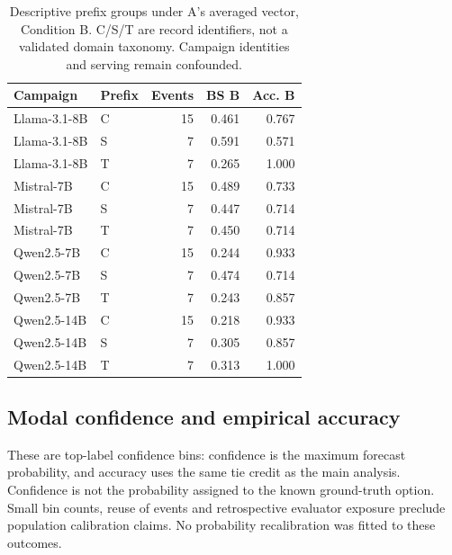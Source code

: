 \begin{table}[!htbp]
\centering\small
\caption{Descriptive prefix groups under A's averaged vector, Condition B. C/S/T are record identifiers, not a validated domain taxonomy. Campaign identities and serving remain confounded.}
\label{tab:full_prefix}
\begin{tabular}{llrrr}
\toprule
Campaign & Prefix & Events & BS B & Acc. B \\
\midrule
Llama-3.1-8B & C & 15 & 0.461 & 0.767 \\
Llama-3.1-8B & S & 7 & 0.591 & 0.571 \\
Llama-3.1-8B & T & 7 & 0.265 & 1.000 \\
Mistral-7B & C & 15 & 0.489 & 0.733 \\
Mistral-7B & S & 7 & 0.447 & 0.714 \\
Mistral-7B & T & 7 & 0.450 & 0.714 \\
Qwen2.5-7B & C & 15 & 0.244 & 0.933 \\
Qwen2.5-7B & S & 7 & 0.474 & 0.714 \\
Qwen2.5-7B & T & 7 & 0.243 & 0.857 \\
Qwen2.5-14B & C & 15 & 0.218 & 0.933 \\
Qwen2.5-14B & S & 7 & 0.305 & 0.857 \\
Qwen2.5-14B & T & 7 & 0.313 & 1.000 \\
\bottomrule
\end{tabular}
\end{table}


\clearpage\subsection{Modal confidence and empirical accuracy}

These are top-label confidence bins: confidence is the maximum forecast probability, and accuracy uses the same tie credit as the main analysis. Confidence is not the probability assigned to the known ground-truth option. Small bin counts, reuse of events and retrospective evaluator exposure preclude population calibration claims. No probability recalibration was fitted to these outcomes.

